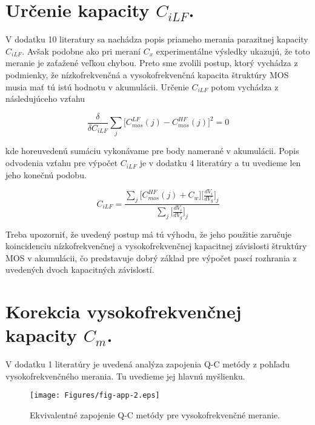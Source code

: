 \section{Určenie kapacity $C_{iLF}$.}\label{sec:E.3}

V dodatku 10 literatury \cite{App.4} sa nachádza popis priameho
merania parazitnej kapacity $C_{iLF}$. Avšak podobne ako pri meraní
$C_x$ experimentálne výsledky ukazujú, že toto meranie je zaťažené
veľkou chybou. Preto sme zvolili postup, ktorý vychádza z podmienky,
že nízkofrekvenčná a vysokofrekvenčná kapacita štruktúry MOS musia mať
tú istú hodnotu v akumulácii. Určenie $C_{iLF}$ potom vychádza z
následujúceho vzťahu

\begin{equation}\label{eq:E.4}
\frac{\delta}{\delta C_{iLF}} \sum\limits_{j} \bigg[C_{mos}^{LF}(j) - C_{mos}^{HF}(j)\bigg]^2 = 0
\end{equation}

kde horeuvedenú sumáciu vykonávame pre body namerané v
akumulácii. Popis odvodenia vzťahu pre výpočet $C_{iLF}$ je v dodatku
4 literatúry \cite{App.4} a tu uvedieme len jeho konečnú podobu.

\begin{equation}\label{eq:E.5}
C_{iLF} = \frac{\sum\limits_{j} {\Bigg[C_{mos}^{HF}(j)+C_{w}\Bigg]\Bigg[\frac{dV_i}{dV_g}\Bigg]_j}}
{\sum\limits_{j} \Bigg[\frac{dV_i}{dV_g}\Bigg]_j}
\end{equation}

Treba upozorniť, že uvedený postup má tú výhodu, že jeho použitie
zaručuje koincidenciu nízkofrekvenčnej a vysokofrekvenčnej kapacitnej
závislosti štruktúry MOS v akumulácii, čo predstavuje dobrý základ pre
výpočet pascí rozhrania z uvedených dvoch kapacitných závislostí.


\section{Korekcia vysokofrekvenčnej kapacity $C_m$.}\label{sec:E.4}

V dodatku 1 literatúry \cite{App.2} je uvedená analýza zapojenia Q-C
metódy z pohľadu vysokofrekvenčného merania. Tu uvedieme jej hlavnú
myšlienku.

\begin{figure}[h!]\centering
\texttt{[image: Figures/fig-app-2.eps]}
\captionsetup{justification=raggedright, singlelinecheck=false}
\caption[Ekvivalentné zapojenie Q-C metódy pre vysokofrekvenčné
  meranie]{Ekvivalentné zapojenie Q-C metódy pre vysokofrekvenčné
  meranie.}
\label{fig:App.2}
\end{figure}


